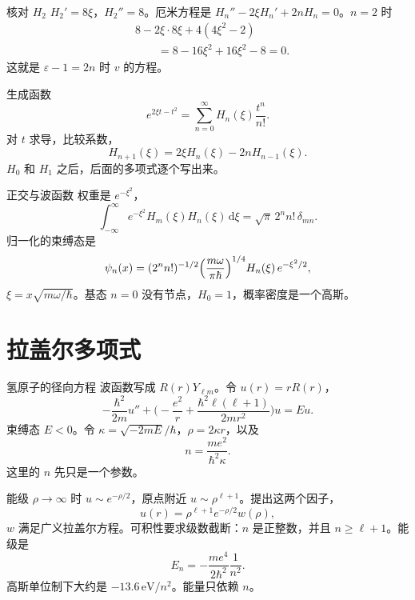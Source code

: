 \documentclass[fontset=windows, chinese, 10pt, xcolor=dvipsnames]{beamer}
\begin{document}
\begin{frame}{核对 $H_2$}
  $H_2'=8\xi$，$H_2''=8$。厄米方程是 $H_n''-2\xi H_n'+2n H_n=0$。$n=2$ 时
  \begin{align*}
    &8-2\xi\cdot 8\xi+4(4\xi^2-2)\\
    &\qquad=8-16\xi^2+16\xi^2-8=0.
  \end{align*}
  这就是 $\varepsilon-1=2n$ 时 $v$ 的方程。
\end{frame}

\begin{frame}{生成函数}
  \[
    e^{2\xi t-t^2}
    =\sum_{n=0}^{\infty} H_n(\xi)\frac{t^n}{n!}.
  \]
  对 $t$ 求导，比较系数，
  \[
    H_{n+1}(\xi)=2\xi H_n(\xi)-2n H_{n-1}(\xi).
  \]
  $H_0$ 和 $H_1$ 之后，后面的多项式逐个写出来。
\end{frame}

\begin{frame}{正交与波函数}
  权重是 $e^{-\xi^2}$，
  \[
    \int_{-\infty}^{\infty}
      e^{-\xi^2} H_m(\xi) H_n(\xi)\,\mathrm{d}\xi
    =\sqrt{\pi}\,2^n n!\,\delta_{mn}.
  \]
  归一化的束缚态是
  \[
    \psi_n(x)
    =(2^n n!)^{-1/2}
      \Bigl(\frac{m\omega}{\pi\hbar}\Bigr)^{1/4}
      H_n(\xi)\,e^{-\xi^2/2},
  \]
  $\xi=x\sqrt{m\omega/\hbar}$。基态 $n=0$ 没有节点，$H_0=1$，概率密度是一个高斯。
\end{frame}

\section{拉盖尔多项式}

\begin{frame}{氢原子的径向方程}
  波函数写成 $R(r)Y_{\ell m}$。令 $u(r)=r R(r)$，
  \[
    -\frac{\hbar^2}{2m}u''
    +\Biggl(-\frac{e^2}{r}
      +\frac{\hbar^2\ell(\ell+1)}{2m r^2}\Biggr)u
    =E u.
  \]
  束缚态 $E<0$。令 $\kappa=\sqrt{-2mE}/\hbar$，$\rho=2\kappa r$，以及
  \[
    n=\frac{m e^2}{\hbar^2\kappa}.
  \]
  这里的 $n$ 先只是一个参数。
\end{frame}

\begin{frame}{能级}
  $\rho\to\infty$ 时 $u\sim e^{-\rho/2}$，原点附近 $u\sim\rho^{\ell+1}$。提出这两个因子，
  \[
    u(r)=\rho^{\ell+1}e^{-\rho/2} w(\rho),
  \]
  $w$ 满足广义拉盖尔方程。可积性要求级数截断：$n$ 是正整数，并且 $n\geq\ell+1$。能级是
  \begin{equation*}
    \boxed{\displaystyle
      E_n=-\frac{m e^4}{2\hbar^2}\frac{1}{n^2}.}
  \end{equation*}
  高斯单位制下大约是 $-13.6\,\mathrm{eV}/n^2$。能量只依赖 $n$。
\end{frame}
\end{document}
